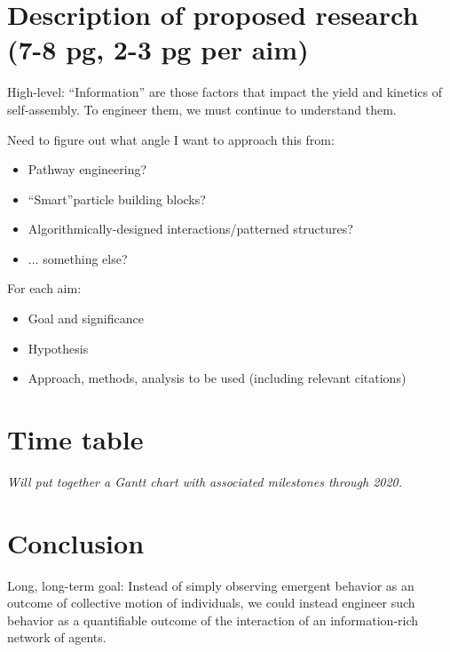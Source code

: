 \documentclass[12pt, oneside]{article}   	%
\begin{document}
\section{Description of proposed research (7-8 pg, 2-3 pg per aim)}

High-level: ``Information'' are those factors that impact the yield and kinetics of self-assembly. To engineer them, we must continue to understand them.

Need to figure out what angle I want to approach this from:
\begin{itemize}
\item Pathway engineering?
\item``Smart''particle building blocks?
\item Algorithmically-designed interactions/patterned structures?
\item ... something else?
\end{itemize}

For each aim:
\begin{itemize}
\item Goal and significance
\item Hypothesis
\item Approach, methods, analysis to be used (including relevant citations)
\end{itemize}

\section{Time table}
\textit{Will put together a Gantt chart with associated milestones through 2020.}

\section{Conclusion}
Long, long-term goal: Instead of simply observing emergent behavior as an outcome of collective motion of individuals, we could instead engineer such behavior as a quantifiable outcome of the interaction of an information-rich network of agents.
\end{document}
